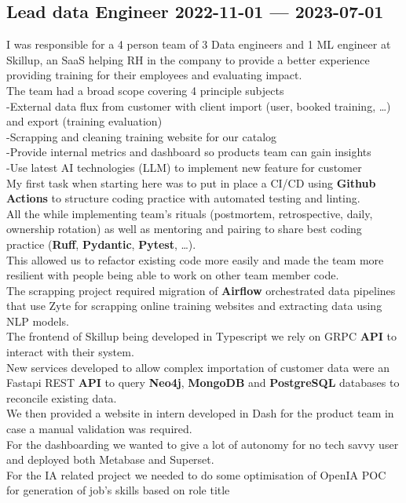 \documentclass[10pt]{article}
\begin{document}
\subsection{{Lead data Engineer \hspace*{\fill} 2022-11-01 --- 2023-07-01}}
\smallskip
{}
\medskip
I was responsible for a 4 person team of 3 Data engineers and 1 ML engineer at Skillup, an SaaS helping RH in the company to provide a better experience providing training for their employees and evaluating impact.\\
            The team had a broad scope covering 4 principle subjects\\
            -External data flux from customer with client import (user, booked training, …) and export (training evaluation)\\
            -Scrapping and cleaning training website for our catalog\\
            -Provide internal metrics and dashboard so products team can gain insights\\
            -Use latest AI technologies (LLM) to implement new feature for customer\\
            My first task when starting here was to put in place a CI/CD using \textbf{Github} \textbf{Actions} to structure coding practice with automated testing and linting.\\
            All the while implementing team's rituals (postmortem, retrospective, daily, ownership rotation) as well as mentoring and pairing to share best coding practice (\textbf{Ruff}, \textbf{Pydantic}, \textbf{Pytest}, …).\\
            This allowed  us to refactor existing code more easily and made the team more resilient with people being able to work on other team member code.\\
            The scrapping project required migration of \textbf{Airflow} orchestrated data pipelines that use Zyte for scrapping online training websites and extracting data using NLP models.\\
            The frontend of Skillup being developed in Typescript we rely on GRPC \textbf{API} to interact with their system.\\
            New services developed to allow complex importation of customer data were an Fastapi REST \textbf{API} to query \textbf{Neo4j}, \textbf{MongoDB} and \textbf{PostgreSQL} databases to reconcile existing data.\\
            We then provided a website in intern developed in Dash for the product team in case a manual validation was required.\\
            For the dashboarding we wanted to give a lot of autonomy for no tech savvy user and deployed both Metabase and Superset.\\
            For the IA related project we needed to do some optimisation of OpenIA POC for generation of job's skills based on role title
\medskip
\end{document}
